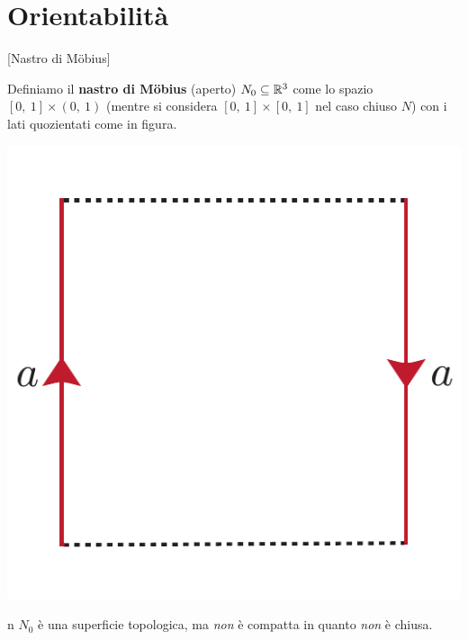 \section{Orientabilità}
\begin{definition}{}[Nastro di Möbius]\label{nastromobius}
\begin{minipage}{.75\linewidth}
Definiamo il \textbf{nastro di Möbius} (aperto) $N_0\subseteq \mathbb{R}^3$ come lo spazio $\left[0,\ 1\right]\times (0,\ 1)$ (mentre si considera $\left[0,\ 1\right]\times [0,\ 1]$ nel caso chiuso $N$) con i lati quozientati come in figura.
	\end{minipage}
	\begin{minipage}{.14\linewidth}
		\begin{center}
			\includegraphics[trim=0cm 0cm 0cm 0cm, clip, scale=0.4]{images/openmoebius.pdf}
		\end{center}
	\end{minipage}
\end{definition}
\begin{remark}{n}
	$N_0$ è una superficie topologica, ma \textit{non} è compatta in quanto \textit{non} è chiusa.
\end{remark}
